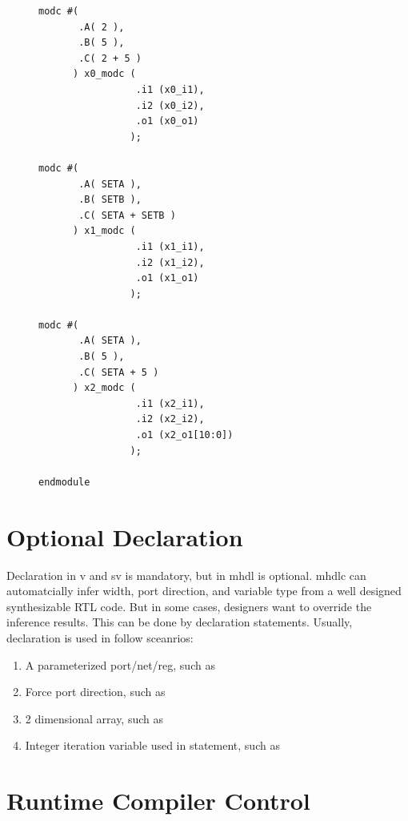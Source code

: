 \begin{figure}[p]
\begin{minipage}[t]{.48\textwidth}
\begin{lstlisting}[caption={Generated wrapper module in SystemVerilog}, label={lst:wrapper in sv}]
modc #(
       .A( 2 ),
       .B( 5 ),
       .C( 2 + 5 )	 
      ) x0_modc (
                 .i1 (x0_i1),
                 .i2 (x0_i2),
                 .o1 (x0_o1)
                );

modc #(
       .A( SETA ),
       .B( SETB ),
       .C( SETA + SETB )	 
      ) x1_modc (
                 .i1 (x1_i1),
                 .i2 (x1_i2),
                 .o1 (x1_o1)
                );

modc #(
       .A( SETA ),
       .B( 5 ),
       .C( SETA + 5 )	 
      ) x2_modc (
                 .i1 (x2_i1),
                 .i2 (x2_i2),
                 .o1 (x2_o1[10:0])
                );

endmodule
    \end{lstlisting}
  \end{minipage}
\end{figure}

\section{Optional Declaration}
Declaration in \gls{v} and \gls{sv} is mandatory, but in \gls{mhdl} is optional.
\gls{mhdlc} can automatcially infer width, port direction, and variable type 
from a well designed synthesizable RTL code. But in some cases, designers want
to override the inference results. This can be done by declaration statements.
Usually,  declaration is used in follow sceanrios:
\begin{enumerate}
\item A parameterized port/net/reg, such as 
\item Force port direction, such as 
\item 2 dimensional array, such as 
\item Integer iteration variable used in  statement, such as 
\end{enumerate}

\section{Runtime Compiler Control}
